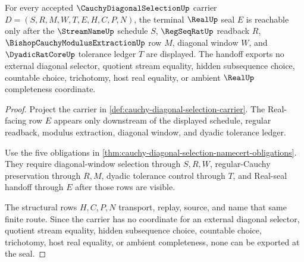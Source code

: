 \begin{theorem}
\label{thm:cauchy-diagonal-selection-real-seal-handoff}
For every accepted $\CauchyDiagonalSelectionUp$ carrier $D=(S,R,M,W,T,E,H,C,P,N)$, the terminal $\RealUp$ seal $E$ is reachable only after the $\StreamNameUp$ schedule $S$, $\RegSeqRatUp$ readback $R$, $\BishopCauchyModulusExtractionUp$ row $M$, diagonal window $W$, and $\DyadicRatCoreUp$ tolerance ledger $T$ are displayed. The handoff exports no external diagonal selector, quotient stream equality, hidden subsequence choice, countable choice, trichotomy, host real equality, or ambient $\RealUp$ completeness coordinate.
\end{theorem}
\begin{proof}
Project the carrier in \autoref{def:cauchy-diagonal-selection-carrier}. The Real-facing row $E$ appears only downstream of the displayed schedule, regular readback, modulus extraction, diagonal window, and dyadic tolerance ledger.

Use the five obligations in \autoref{thm:cauchy-diagonal-selection-namecert-obligations}. They require diagonal-window selection through $S,R,W$, regular-Cauchy preservation through $R,M$, dyadic tolerance control through $T$, and Real-seal handoff through $E$ after those rows are visible.

The structural rows $H,C,P,N$ transport, replay, source, and name that same finite route. Since the carrier has no coordinate for an external diagonal selector, quotient stream equality, hidden subsequence choice, countable choice, trichotomy, host real equality, or ambient completeness, none can be exported at the seal.
\end{proof}

